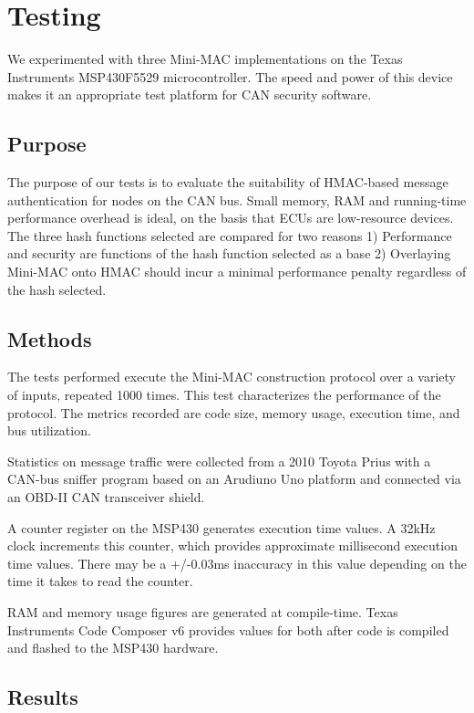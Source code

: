 \section{Testing}
We experimented with three Mini-MAC implementations on the Texas Instruments MSP430F5529 microcontroller. The speed and power of this device makes it an appropriate test platform for CAN security software.

\subsection{Purpose}

The purpose of our tests is to evaluate the suitability of HMAC-based message authentication for nodes on the CAN bus. Small memory, RAM and running-time performance overhead is ideal, on the basis that ECUs are low-resource devices. The three hash functions selected are compared for two reasons 1) Performance and security are functions of the hash function selected as a base 2) Overlaying Mini-MAC onto HMAC should incur a minimal performance penalty regardless of the hash selected.

\subsection{Methods}

The tests performed execute the Mini-MAC construction protocol over a variety of inputs, repeated 1000 times. This test characterizes the performance of the protocol. The metrics recorded are code size, memory usage, execution time, and bus utilization.

Statistics on message traffic were collected from a 2010 Toyota Prius with a CAN-bus sniffer program  based on an Arudiuno Uno platform and connected via an OBD-II CAN transceiver shield.

A counter register on the MSP430 generates execution time values. A 32kHz clock increments this counter, which provides approximate millisecond execution time values. There may be a +/-0.03ms inaccuracy in this value depending on the time it takes to read the counter.

RAM and memory usage figures are generated at compile-time. Texas Instruments Code Composer v6 provides values for both after code is compiled and flashed to the MSP430 hardware.

\subsection{Results}

